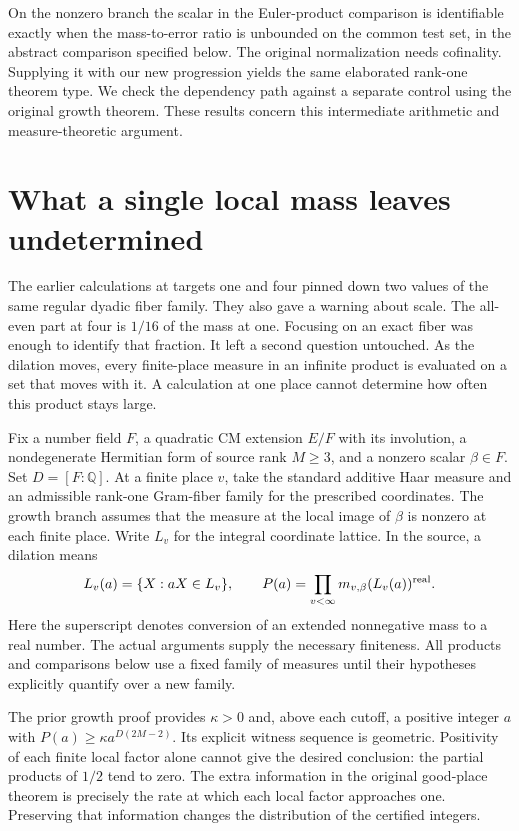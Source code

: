 \documentclass[12pt,letterpaper]{article}
\begin{document}
On the nonzero branch the scalar in the Euler-product comparison is identifiable exactly when the mass-to-error ratio is unbounded on the common test set, in the abstract comparison specified below. The original normalization needs cofinality. Supplying it with our new progression yields the same elaborated rank-one theorem type. We check the dependency path against a separate control using the original growth theorem. These results concern this intermediate arithmetic and measure-theoretic argument.
\clearpage{\small\setlength{\parskip}{0pt}\tableofcontents}\clearpage{}
\section{What a single local mass leaves undetermined}
The earlier calculations at targets one and four pinned down two values of the same regular dyadic fiber family. They also gave a warning about scale. The all-even part at four is $1/16$ of the mass at one. Focusing on an exact fiber was enough to identify that fraction. It left a second question untouched. As the dilation moves, every finite-place measure in an infinite product is evaluated on a set that moves with it. A calculation at one place cannot determine how often this product stays large.

Fix a number field $F$, a quadratic CM extension $E/F$ with its involution, a nondegenerate Hermitian form of source rank $M\ge3$, and a nonzero scalar $\beta\in F$. Set $D=[F:\mathbb Q]$. At a finite place $v$, take the standard additive Haar measure and an admissible rank-one Gram-fiber family for the prescribed coordinates. The growth branch assumes that the measure at the local image of $\beta$ is nonzero at each finite place. Write $L_v$ for the integral coordinate lattice. In the source, a dilation means
\[
 L_v(a)=\{X:aX\in L_v\},\qquad
 P(a)=\prod_{v<\infty} m_{v,\beta}(L_v(a))^{\rm real}.
\]
Here the superscript denotes conversion of an extended nonnegative mass to a real number. The actual arguments supply the necessary finiteness. All products and comparisons below use a fixed family of measures until their hypotheses explicitly quantify over a new family.

The prior growth proof provides $\kappa>0$ and, above each cutoff, a positive integer $a$ with $P(a)\ge\kappa a^{D(2M-2)}$. Its explicit witness sequence is geometric. Positivity of each finite local factor alone cannot give the desired conclusion: the partial products of $1/2$ tend to zero. The extra information in the original good-place theorem is precisely the rate at which each local factor approaches one. Preserving that information changes the distribution of the certified integers.
\end{document}
